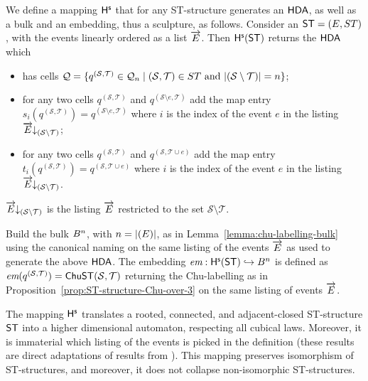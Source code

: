     \begin{definition}
        \label{def:ST-to-Sculptures} 
        We define a mapping $\mathsf{H}^{\mathsf{s}}$ that for any ST-structure generates an $\text{\textup{\textsf{HDA}}}$, as well as a bulk and an embedding, thus a sculpture, as follows.  Consider an $\mathsf{ST}=(E,ST)$, with the events linearly ordered as a list $\overrightarrow{E}$. Then $\mathsf{H}^{\mathsf{s}}(\mathsf{ST})$ returns the $\text{\textup{\textsf{HDA}}}$ which
  
        \begin{itemize}
            \item has cells $\mathcal{Q}=\{q^{(\mathcal{S},\mathcal{T})}\in \mathcal{Q}_{n} \mid (\mathcal{S},\mathcal{T})\in ST \mbox{ and } | (\mathcal{S} \setminus \mathcal{T})|=n\}$;
            \item for any two cells $q^{(\mathcal{S},\mathcal{T})}$ and $q^{(\mathcal{S} \setminus e,\mathcal{T})}$ add the map entry $s_{i}(q^{(\mathcal{S},\mathcal{T})})=q^{(\mathcal{S} \setminus e,\mathcal{T})}$ where $i$ is the index of the event $e$ in the listing $\overrightarrow{E}\!\!\downarrow_{(\mathcal{S} \setminus \mathcal{T})}$;
            \item for any two cells $q^{(\mathcal{S},\mathcal{T})}$ and $q^{(\mathcal{S},\mathcal{T} \cup e)}$ add the map entry $t_{i}(q^{(\mathcal{S},\mathcal{T})})=q^{(\mathcal{S},\mathcal{T} \cup e)}$ where $i$ is the index of the event $e$ in the listing $\overrightarrow{E}\!\!\downarrow_{(\mathcal{S} \setminus \mathcal{T})}$.
        \end{itemize}
        
        $\overrightarrow{E}\!\!\downarrow_{(\mathcal{S} \setminus \mathcal{T})}$ is the listing $\overrightarrow{E}$ restricted to the set $\mathcal{S} \setminus \mathcal{T}$.
 
        Build the bulk $B^{n}$, with $n=| (E)|$, as in Lemma~\ref{lemma:chu-labelling-bulk} using the canonical naming on the same listing of the events $\overrightarrow{E}$ as used to generate the above $\text{\textup{\textsf{HDA}}}$.  The embedding $\textit{em}:\mathsf{H}^{\mathsf{s}}(\mathsf{ST})\hookrightarrow B^{n}$ is defined as $\textit{em}(q^{(\mathcal{S},\mathcal{T})})=\mathsf{ChuST}(\mathcal{S},\mathcal{T})$ returning the Chu-labelling as in Proposition~\ref{prop:ST-structure-Chu-over-3} on the same listing of events $\overrightarrow{E}$.
    \end{definition}
    
    The mapping $\mathsf{H}^{\mathsf{s}}$ translates a rooted, connected, and adjacent-closed ST-structure $\mathsf{ST}$ into a higher dimensional automaton, respecting all cubical laws. Moreover, it is immaterial which listing of the events is picked in the definition (these results are direct adaptations of results from \cite{Johansen16STstruct}). This mapping preserves isomorphism of ST-structures, and moreover, it does not collapse non-isomorphic ST-structures.

